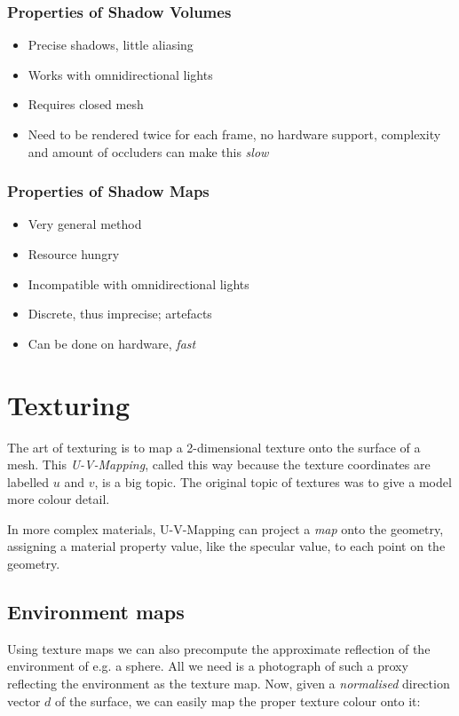 \documentclass{panikzettel}
\begin{document}
\begin{halfboxl}
\subsubsection*{Properties of Shadow Volumes}
\begin{itemize}
    \item Precise shadows, little aliasing
    \item Works with omnidirectional lights
    \item Requires closed mesh
    \item Need to be rendered twice for each frame, no hardware support, complexity and amount of occluders can make this \emph{slow}
\end{itemize}
\end{halfboxl}%
\begin{halfboxr}
\subsubsection*{Properties of Shadow Maps}
\begin{itemize}
    \item Very general method
    \item Resource hungry
    \item Incompatible with omnidirectional lights
    \item Discrete, thus imprecise; artefacts
    \item Can be done on hardware, \emph{fast}
\end{itemize}
\end{halfboxr}

\section{Texturing}

The art of texturing is to map a 2-dimensional texture onto the surface of a mesh. This \emph{U-V-Mapping}, called this way because the texture coordinates are labelled $u$ and $v$, is a big topic. The original topic of textures was to give a model more colour detail.

In more complex materials, U-V-Mapping can project a \emph{map} onto the geometry, assigning a material property value, like the specular value, to each point on the geometry.

\subsection{Environment maps}
Using texture maps we can also precompute the approximate reflection of the environment of e.g. a sphere. All we need is a photograph of such a proxy reflecting the environment as the texture map. Now, given a \emph{normalised} direction vector $d$ of the surface, we can easily map the proper texture colour onto it:
\end{document}
